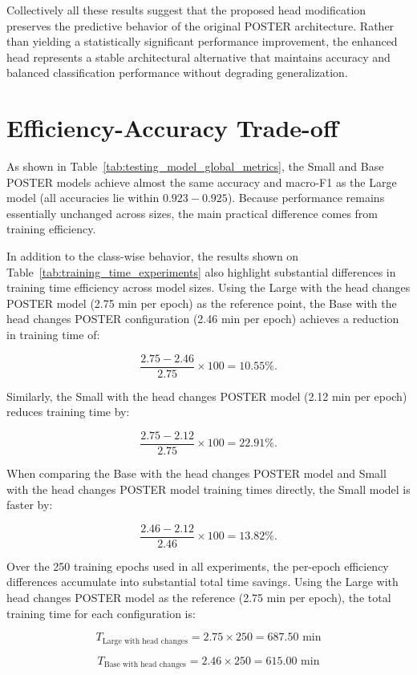Collectively all these results suggest that the proposed head modification preserves the predictive behavior of the original \gls{POSTER} architecture. Rather than yielding a statistically significant performance improvement, the enhanced head represents a stable architectural alternative that maintains accuracy and balanced classification performance without degrading generalization.

\section{Efficiency-Accuracy Trade-off}

As shown in Table~\ref{tab:testing_model_global_metrics}, the Small and Base POSTER models achieve almost the same accuracy and macro-F1 as the Large model (all accuracies lie within $0.923-0.925$). Because performance remains essentially unchanged across sizes, the main practical difference comes from training efficiency. 

In addition to the class-wise behavior, the results shown on Table~\ref{tab:training_time_experiments} also highlight substantial differences in training time efficiency across model sizes. Using the Large with the head changes POSTER model (2.75 min per epoch) as the reference point, the Base with the head changes POSTER configuration (2.46 min per epoch) achieves a reduction in training time of:

$$
\frac{2.75 - 2.46}{2.75} \times 100 = 10.55\% .
$$

Similarly, the Small with the head changes POSTER model (2.12 min per epoch) reduces training time by:

$$
\frac{2.75 - 2.12}{2.75} \times 100 = 22.91\% .
$$

When comparing the Base with the head changes POSTER model and Small  with the head changes POSTER model training times directly, the Small model is faster by:

$$
\frac{2.46 - 2.12}{2.46} \times 100 = 13.82\% .
$$

Over the 250 training epochs used in all experiments, the per-epoch efficiency differences accumulate into substantial total time savings. Using the Large with head changes POSTER model as the reference (2.75 min per epoch), the total training time for each configuration is:

$$
T_{\text{Large with head changes}} = 2.75 \times 250 = 687.50 \text{ min}
$$

$$
T_{\text{Base with head changes}} = 2.46 \times 250 = 615.00 \text{ min}
$$

